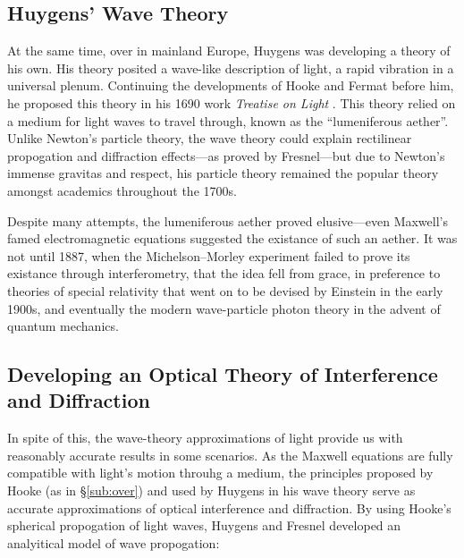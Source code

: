 \documentclass[a4paper]{article}
\begin{document}
\subsection{Huygens' Wave Theory} \label{sub:huyg}
At the same time, over in mainland Europe, Huygens was developing a theory of his own. His theory posited a wave-like description of light, a rapid vibration in a universal plenum. Continuing the developments of Hooke and Fermat before him, he proposed this theory in his 1690 work \emph{Treatise on Light} \cite{gut:huyg}. This theory relied on a medium for light waves to travel through, known as the ``lumeniferous aether''. Unlike Newton's particle theory, the wave theory could explain rectilinear propogation and diffraction effects---as proved by Fresnel---but due to Newton's immense gravitas and respect, his particle theory remained the popular theory amongst academics throughout the 1700s.

Despite many attempts, the lumeniferous aether proved elusive---even Maxwell's famed electromagnetic equations suggested the existance of such an aether. It was not until 1887, when the Michelson–Morley experiment failed to prove its existance through interferometry, that the idea fell from grace, in preference to theories of special relativity that went on to be devised by Einstein in the early 1900s, and eventually the modern wave-particle photon theory in the advent of quantum mechanics.

\subsection{Developing an Optical Theory of Interference and Diffraction}

In spite of this, the wave-theory approximations of light provide us with reasonably accurate results in some scenarios. As the Maxwell equations are fully compatible with light's motion throuhg a medium, the principles proposed by Hooke (as in \S\ref{sub:over}) and used by Huygens in his wave theory serve as accurate approximations of optical interference and diffraction. By using Hooke's spherical propogation of light waves, Huygens and Fresnel developed an analyitical model of wave propogation:
\end{document}

